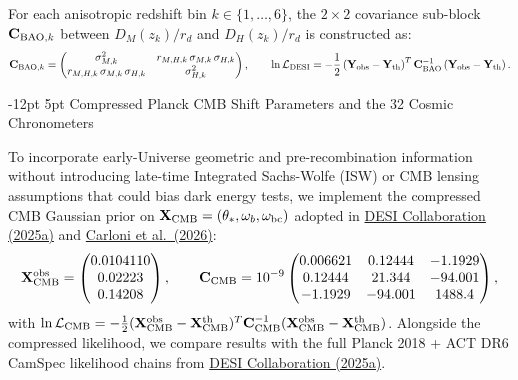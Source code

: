 \documentclass[11pt,letterpaper]{article}
\makeatletter
\renewcommand{\subsection}{\@startsection{subsection}{2}{\z@}%
  {-12pt \@plus -3pt \@minus -1pt}%
  {5pt \@plus 1pt}%
  {\normalfont\large\bfseries\color{tealaccent}}}
\makeatother
\begin{document}
For each anisotropic redshift bin $k \in \{1,\dots,6\}$, the $2 \times 2$ covariance sub-block $\mathbf{C}_{{\rm BAO},k}$ between $D_M(z_k)/r_d$ and $D_H(z_k)/r_d$ is constructed as:
\begin{equation}
    \mathbf{C}_{{\rm BAO},k} = \begin{pmatrix} \sigma_{M,k}^2 & r_{M,H,k}\, \sigma_{M,k}\, \sigma_{H,k} \\ r_{M,H,k}\, \sigma_{M,k}\, \sigma_{H,k} & \sigma_{H,k}^2 \end{pmatrix}, \qquad \ln \mathcal{L}_{\rm DESI} = -\frac{1}{2} \left(\mathbf{Y}_{\rm obs} - \mathbf{Y}_{\rm th}\right)^T \mathbf{C}_{\rm BAO}^{-1} \left(\mathbf{Y}_{\rm obs} - \mathbf{Y}_{\rm th}\right).
    \label{eq:L_desi}
\end{equation}

\subsection{Compressed Planck CMB Shift Parameters and the 32 Cosmic Chronometers}

To incorporate early-Universe geometric and pre-recombination information without introducing late-time Integrated Sachs-Wolfe (ISW) or CMB lensing assumptions that could bias dark energy tests, we implement the compressed CMB Gaussian prior on $\mathbf{X}_{\rm CMB} = (\theta_*, \omega_b, \omega_{\rm bc})$ adopted in \href{https://arxiv.org/abs/2503.14738}{DESI Collaboration (2025a)} and \href{https://arxiv.org/pdf/2608.01215}{Carloni et al.\ (2026)}:
\begin{equation}
    \mathbf{X}_{\rm CMB}^{\rm obs} = \begin{pmatrix} 0.0104110 \\ 0.02223 \\ 0.14208 \end{pmatrix}, \qquad \mathbf{C}_{\rm CMB} = 10^{-9} \begin{pmatrix} 0.006621 & 0.12444 & -1.1929 \\ 0.12444 & 21.344 & -94.001 \\ -1.1929 & -94.001 & 1488.4 \end{pmatrix},
    \label{eq:cmb_compressed}
\end{equation}
with $\ln \mathcal{L}_{\rm CMB} = -\frac{1}{2}(\mathbf{X}_{\rm CMB}^{\rm obs} - \mathbf{X}_{\rm CMB}^{\rm th})^T \mathbf{C}_{\rm CMB}^{-1}(\mathbf{X}_{\rm CMB}^{\rm obs} - \mathbf{X}_{\rm CMB}^{\rm th})$. Alongside the compressed likelihood, we compare results with the full Planck 2018 + ACT DR6 CamSpec likelihood chains from \href{https://arxiv.org/abs/2503.14738}{DESI Collaboration (2025a)}.
\end{document}
